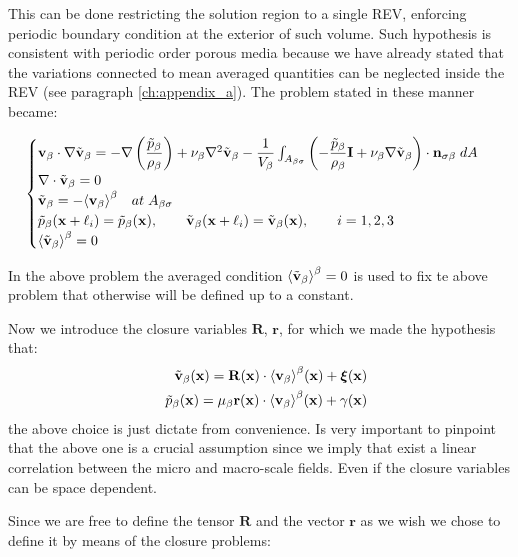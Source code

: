 This can be done restricting the solution region to a single REV, enforcing periodic boundary condition at the exterior of such volume.
Such hypothesis is consistent with periodic order porous media because we have already stated that the variations connected to mean averaged quantities can be neglected inside the REV (see paragraph \ref{ch:appendix_a}).
The problem stated in these manner became:

\begin{eqnarray}
\begin{cases}
\textbf{v}_{\beta} \cdot \nabla \tilde{\textbf{v}}_{\beta} = -\nabla \left(\dfrac{\tilde{p}_{\beta}}{\rho_{\beta}}\right) + \nu_{\beta} \nabla^2 \tilde{\textbf{v}}_{\beta} - \dfrac{1}{V_\beta} \int_{A_{\beta \sigma}} \left(-\dfrac{\tilde{p}_{\beta}}{\rho_{\beta}} \mathbf{I}  + \nu_{\beta} \nabla \tilde{\textbf{v}}_{\beta} \right) \cdot \mathbf{n}_{\sigma \beta} \;dA  \\
\nabla \cdot \tilde{\textbf{v}}_{\beta} = 0  \\
\tilde{\textbf{v}}_{\beta} = -{\left< \textbf{v}_{\beta} \right>}^{\beta} \quad at \; A_{\beta \sigma} \\
\tilde{p}_{\beta}(\mathbf{x} +\ell_i) = \tilde{p}_{\beta}(\mathbf{x}), \qquad \tilde{\textbf{v}}_{\beta}(\mathbf{x} +\ell_i) = \tilde{\textbf{v}}_{\beta}(\mathbf{x}), \qquad i=1,2,3 \\
{\left< \tilde{\textbf{v}}_{\beta} \right>}^{\beta} = 0
\end{cases}
\label{eq:vans_mom_2}
\end{eqnarray}

In the above problem the averaged condition ${\left< \tilde{\textbf{v}}_{\beta} \right>}^{\beta} = 0$ is used to fix te above problem that otherwise will be defined up to a constant.

Now we introduce the closure variables $\mathbf{R}$, $\mathbf{r}$, for which we made the hypothesis that:
\begin{eqnarray}
&& \tilde{\textbf{v}}_{\beta}(\mathbf{x}) = \mathbf{R}(\mathbf{x})  \cdot {\left< \textbf{v}_{\beta}\right>}^{\beta}(\mathbf{x})  +\boldsymbol{\xi}(\mathbf{x})   \\
&& \tilde{p}_{\beta}(\mathbf{x})  = \mu_{\beta} \mathbf{r}(\mathbf{x})  \cdot {\left< \textbf{v}_{\beta}\right>}^{\beta}(\mathbf{x})  + \gamma(\mathbf{x})
	\label{eq:closure_viab_hp}
\end{eqnarray}
the above choice is just dictate from convenience.
Is very important to pinpoint that the above one is a crucial assumption since we imply that exist a linear correlation between the micro and macro-scale fields.
Even if the closure variables can be space dependent.

Since we are free to define the tensor $\mathbf{R}$  and the vector $\mathbf{r}$ as we wish we chose to define it by means of the closure problems:

